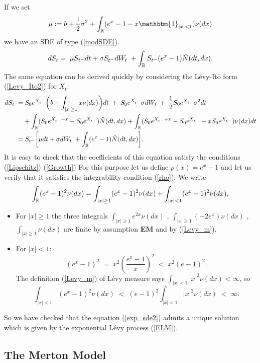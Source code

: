If we set
\begin{equation}\label{mu}
 \mu := b + \frac{1}{2}\sigma^2 + \int_{\R} ( e^{x} - 1 -x\mathbbm{1}_{|x|<1}) \nu(dx)
\end{equation}
we have an SDE of type (\ref{modSDE}). 
\begin{equation}\label{exp_sde2}
 d S_t = \; \mu S_{t^-} dt +  \sigma S_{t^-} dW_t \; + \int_{\mathbb{R}} S_{t^-} (e^{x} - 1) \tilde N(dt,dx). 
\end{equation}
The same equation can be derived quickly by considering the Lévy-It\={o} form (\ref{Levy_Ito2}) for $X_t$:
\begin{align*}
 d S_t \; =& \; S_0 e^{X_{t^-}} \biggl( b + \int_{|x|\geq 1}x \nu(dx) \biggr) dt \; + \; S_0 e^{X_{t^-}} \sigma dW_t \; + \; \frac{1}{2}S_0 e^{X_{t^-}}\sigma^2 dt \\ \nonumber
          &+ \int_{\mathbb{R}} (S_0 e^{X_{t^-}+x} - S_0 e^{X_{t^-}}) \tilde N(dt,dx) + \int_{\mathbb{R}} (S_0 e^{X_{t^-}+x} - S_0 e^{X_{t^-}} - x S_0 e^{X_{t^-}}) \nu(dx) dt \\ \nonumber
          =& \; S_{t^-} \biggl[ \mu dt +  \sigma dW_t \; + \int_{\mathbb{R}} (e^{x} - 1) \tilde N(dt,dx) \biggr].\\
\end{align*}
It is easy to check that the coefficients of this equation satisfy the conditions (\ref{Lipschitz})
(\ref{Growth}) 
For this purpose let us define $\rho(x) = e^x-1$
and let us verify that it satisfies the integrability condition (\ref{rho}):
We write $$ \int_{\mathbb{R}} (e^x-1)^2 \nu(dx) = \int_{|x|\geq1} (e^x-1)^2 \nu(dx) + \int_{|x| < 1} (e^x-1)^2 \nu(dx),$$
 \begin{itemize}
  \item For $|x|\geq 1$ the three integrals $\int_{|x|\geq1} e^{2x} \nu(dx)$ , $\int_{|x|\geq1} (-2e^x) \nu(dx)$ ,
  $\int_{|x|\geq1} \nu(dx)$ are finite by assumption \textbf{EM} and by (\ref{Levy_m}).
  \item For $|x| < 1$: 
  $$(e^x-1)^2 \; = \; x^2 \left(\frac{e^x-1}{x}\right)^2 \; < \; x^2 (e-1)^2. $$ 
The definition (\ref{Levy_m}) of Lévy measure says $ \int_{|x|<1} |x|^2 \nu(dx) < \infty $, so
$$ \int_{|x|<1} (e^x-1)^2 \nu(dx) \; < \; (e-1)^2 \int_{|x|<1} |x|^2 \nu(dx) \; < \; \infty. $$  
 \end{itemize}
So we have checked that the equation (\ref{exp_sde2}) admits a unique solution which is given by the exponential 
Lévy process (\ref{ELM}).

\subsection{The Merton Model}\label{Merton_section}


